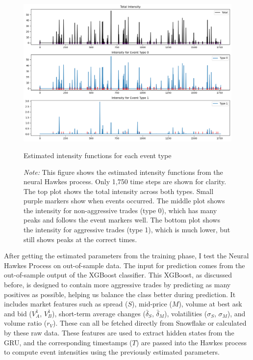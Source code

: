 \begin{figure}[H]
    \centering
    \includegraphics[width=0.95\linewidth]{figures/hp_estimation.png}
    \caption{Estimated intensity functions for each event type}
    \caption*{\textit{Note:} This figure shows the estimated intensity functions from the neural Hawkes process. Only 1,750 time steps are shown for clarity. The top plot shows the total intensity across both types. Small purple markers show when events occurred. The middle plot shows the intensity for non-aggressive trades (type 0), which has many peaks and follows the event markers well. The bottom plot shows the intensity for aggressive trades (type 1), which is much lower, but still shows peaks at the correct times.}

    \label{fig:neuralhp-intensity}
\end{figure}
\newpage
After getting the estimated parameters from the training phase, I test the Neural Hawkes Process on out-of-sample data. The input for prediction comes from the out-of-sample output of the XGBoost classifier. This XGBoost, as discussed before, is designed to contain more aggressive trades by predicting as many positives as possible, helping us balance the class better during prediction. It includes market features such as spread ($S$), mid-price ($M$), volume at best ask and bid ($V_A^1$, $V_B^1$), short-term average changes ($\bar{\delta}_S$, $\bar{\delta}_M$), volatilities ($\sigma_S$, $\sigma_M$), and volume ratio ($r_V$). These can all be fetched directly from Snowflake or calculated by these raw data. These features are used to extract hidden states from the GRU, and the corresponding timestamps ($T$) are passed into the Hawkes process to compute event intensities using the previously estimated parameters.

